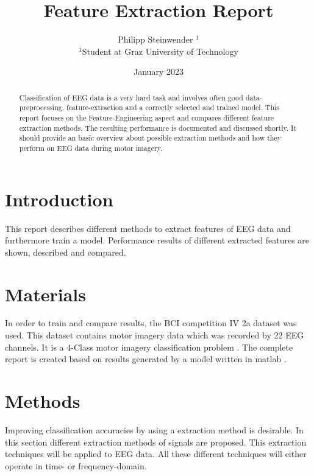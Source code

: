 \documentclass{article}
\title{Feature Extraction Report}
\author{Philipp Steinwender $^{1}$ \\
    \small $^{1}$Student at Graz University of Technology
}
\date{January 2023}
\begin{document}
\maketitle

\begin{abstract}
Classification of EEG data is a very hard task and involves often good data-preprocessing, feature-extraction and a correctly selected and trained model. This report focuses on the Feature-Engineering aspect and compares different feature extraction methods. The resulting performance is documented and discussed shortly. It should provide an basic overview about possible extraction methods and how they perform on EEG data during motor imagery.
\end{abstract} \hspace{10pt}
\newpage
\tableofcontents
\newpage

\section{Introduction}
This report describes different methods to extract features of EEG data and furthermore train a model. Performance results of different extracted features are shown, described and compared.
\section{Materials}
In order to train and compare results, the BCI competition IV 2a dataset was used. This dataset contains motor imagery data which was recorded by 22 EEG channels. It is a 4-Class motor imagery classification problem \parencite{10.3389/fnins.2012.00055, brunner2008bci}.
The complete report is created based on results generated by a model written in matlab \parencite{Steinwender_Research_Software_2022}.

\section{Methods}
Improving classification accuracies by using a extraction method is desirable. In this section different extraction methods of signals are proposed. This extraction techniques will be applied to EEG data. All these different techniques will either operate in time- or frequency-domain.
\end{document}
